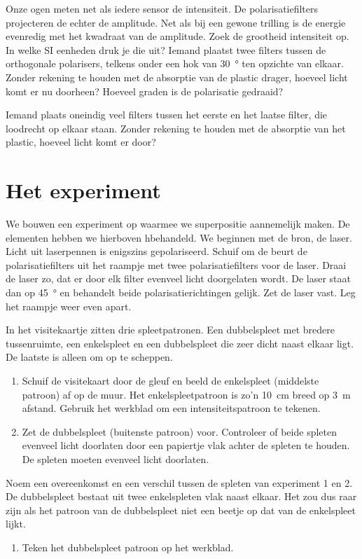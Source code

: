 \documentclass[../../main.tex]{subfiles}
\begin{document}
Onze ogen meten net als iedere sensor de intensiteit. De 
polarisatiefilters projecteren de echter de amplitude. Net als bij een gewone trilling is de energie evenredig met het kwadraat van de amplitude.
\easy Zoek de grootheid intensiteit op. In welke SI eenheden druk je die uit?
\diff Iemand plaatst twee  filters tussen de orthogonale polarisers, telkens onder een hok van \SI{30}{\degree} ten opzichte van elkaar. Zonder rekening te houden met de absorptie van de plastic drager, hoeveel licht komt er nu doorheen? Hoeveel graden is de polarisatie gedraaid?

\fun Iemand plaats oneindig veel filters tussen het eerste en het laatse filter, die loodrecht op elkaar staan. Zonder rekening te houden met de absorptie van het plastic, hoeveel licht komt er door?

\section{Het experiment}
We bouwen een experiment op waarmee we superpositie aannemelijk maken. De elementen hebben we hierboven hbehandeld. We beginnen met de bron, de laser. Licht uit laserpennen is enigszins gepolariseerd. 
Schuif om de beurt de polarisatiefilters uit het raampje met twee polarisatiefilters voor de laser. Draai de laser zo, dat er door elk filter evenveel licht doorgelaten wordt. De laser staat dan op \SI{45}{\degree} en behandelt beide polarisatierichtingen gelijk. Zet de laser vast. Leg het raampje weer even apart.

In het visitekaartje zitten drie spleetpatronen. Een dubbelspleet met bredere tussenruimte, een enkelspleet en een dubbelspleet die zeer dicht naast elkaar ligt. De laatste is alleen om op te scheppen. 

\begin{enumerate}[nosep]
\item Schuif de visitekaart door de gleuf en beeld de enkelspleet (middelste patroon) af op de muur. Het enkelspleetpatroon is zo'n \SI{10}{\centi\meter} breed op \SI{3}{\meter} afstand. Gebruik het werkblad om een intensiteitspatroon te tekenen.
     
\item Zet de dubbelspleet (buitenste patroon) voor. Controleer of beide spleten evenveel licht doorlaten door een papiertje vlak achter de spleten te houden. De spleten moeten evenveel licht doorlaten.
\end{enumerate}

\easy Noem een overeenkomst en een verschil tussen de spleten van experiment 1 en 2. 
De dubbelspleet bestaat uit twee enkelspleten vlak naast elkaar. Het zou dus raar zijn als het patroon van de dubbelspleet niet een beetje op dat van de enkelspleet lijkt.
\begin{enumerate}
\item Teken het dubbelspleet patroon op het werkblad.
\end{enumerate}
\end{document}
